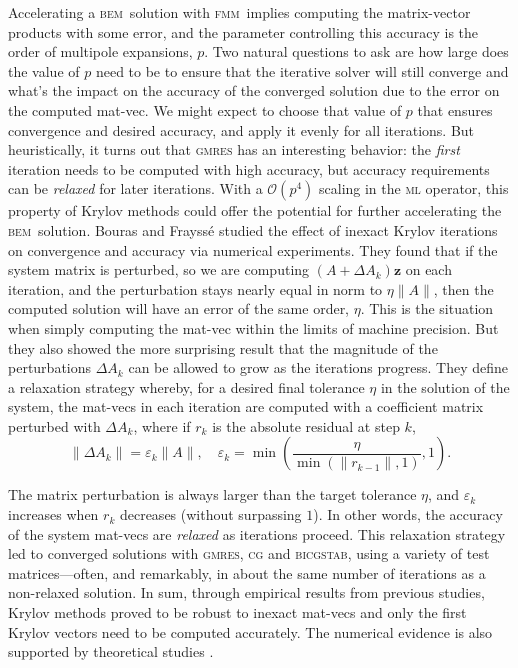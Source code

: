 \documentclass[smallcondensed,final]{svjour3}
\newcommand{\bem}{\textsc{bem}\xspace}
\newcommand{\fmm}{\textsc{fmm}\xspace}
\renewcommand{\O}[1]{\mathcal{O}(#1)}
\newcommand{\mtol}{\textsc{m}\texttwooldstyle\textsc{l}\xspace} %
\newcommand{\gmres}{\textsc{gmres}\xspace}
\newcommand{\vect}[1]{\mathbf{#1}}
\begin{document}
Accelerating a \bem\ solution with \fmm\ implies computing the matrix-vector products with some error, and the parameter controlling this accuracy is the order of multipole expansions, $p$. 
Two natural questions to ask are how large does the value of $p$ need to be to ensure that the iterative solver will still converge and what's the impact on the accuracy of the converged solution due to the error on the computed mat-vec.
We might expect to choose that value of $p$ that ensures convergence and desired accuracy, and apply it evenly for all iterations. 
But heuristically, it turns out that \gmres has an interesting behavior: the \emph{first} iteration needs to be computed with high accuracy, but accuracy requirements can be \emph{relaxed} for later iterations. 
With a $\O{p^{4}}$ scaling in the \mtol operator, this property of Krylov methods could offer the potential for further accelerating the \bem\ solution.
Bouras and Frayss{\'e} \cite{bouras2000relaxation,bourasfraysse2005} studied the effect of inexact Krylov iterations on convergence and accuracy via numerical experiments.
They found that if the system matrix is perturbed, so we are computing $(A+\Delta A_k)\vect{z}$ on each iteration, and the perturbation stays nearly equal in norm to $\eta \|A\|$, then the computed solution will have an error of the same order, $\eta$. This is the situation when simply computing the mat-vec within the limits of machine precision. But they also showed the more surprising result that the magnitude of the perturbations $\Delta A_k$ can be allowed to grow as the iterations progress.
They define a relaxation strategy whereby, for a desired final tolerance $\eta$ in the solution of the system, the mat-vecs in each iteration are computed with a coefficient matrix perturbed with $\Delta A_k$, where if $r_k$ is the absolute residual at step $k$,
%
\begin{equation}\label{eqn:matrix-perturbation}
  \|\Delta A_k\| = \varepsilon_k\|A\|, \quad \varepsilon_k=\min\left( \frac{\eta}{\min(\|r_{k-1}\|,1)}, 1\right).
\end{equation}

\noindent The matrix perturbation is always larger than the target tolerance $\eta$, and $\varepsilon_k$ increases when $r_k$ decreases (without surpassing $1$). In other words, the accuracy of the system mat-vecs are \emph{relaxed} as iterations proceed. This relaxation strategy led to converged solutions with \gmres, \textsc{cg} and \textsc{bicgstab}, using a variety of test matrices---often, and remarkably, in about the same number of iterations as a non-relaxed solution. In sum, through empirical results from previous studies, Krylov methods proved to be robust to inexact mat-vecs and only the first Krylov vectors need to be computed accurately.
The numerical evidence is also supported by theoretical studies \cite{simonciniszyld2003,vandeneshofsleijpen2004}.
\end{document}
